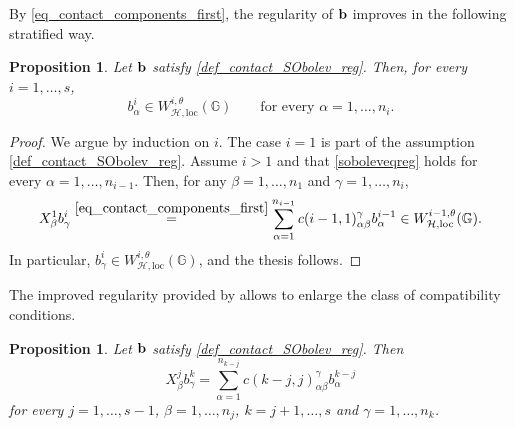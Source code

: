 \documentclass[11pt]{amsart}
\newcommand{\hhh}{{\mathcal{H}}}
\newcommand{\bb}{{\bf {b}}} %
\theoremstyle{plain}
\newtheorem{proposition}[theorem]{Proposition}
\theoremstyle{definition}
\theoremstyle{remark}
\numberwithin{equation}{section}
\begin{document}
By \eqref{eq_contact_components_first}, the regularity of $\bb$ improves in the following stratified way.
\begin{proposition}\label{rem_iterated_contact_components}
    Let $\bb$ satisfy \eqref{def_contact_SObolev_reg}. Then, for every $i=1,\ldots,s$,
    \begin{equation}\label{soboleveqreg}
        b^i_\alpha\in W^{i,\theta}_{\hhh,\mathrm{loc}}(\mathbb G)\qquad\text{for every $\alpha=1,\ldots,n_i$.}
    \end{equation}
\end{proposition}
\begin{proof} 
We argue by induction on $i$. The case $i=1$ is part of the assumption \eqref{def_contact_SObolev_reg}. Assume $i>1$ and that \eqref{soboleveqreg} holds for every $\alpha=1,\dots,n_{i-1}$. Then, for any $\beta=1,\ldots,n_1$ and $\gamma=1,\dots,n_i$,
\begin{equation*}
X^1_\beta b^i_\gamma \overset{\eqref{eq_contact_components_first}}{=} \sum_{\alpha=1}^{n_{i-1}} c(i-1,1)^\gamma_{\alpha \beta} b^{i-1}_\alpha \in W^{i-1,\theta}_{\hhh,\mathrm{loc}}(\mathbb{G}).
\end{equation*}
In particular, $b^i_\gamma \in W^{i,\theta}_{\hhh,\mathrm{loc}}(\mathbb{G})$, and the thesis follows.
\end{proof}
The improved regularity provided by  allows to enlarge the class of compatibility conditions.
\begin{proposition} \label{prop_contact_components}
  Let $\bb$ satisfy \eqref{def_contact_SObolev_reg}. Then
\begin{equation} \label{eq_contact_components}
X^j_\beta b^k_\gamma = \sum_{\alpha=1}^{n_{k-j}} c(k-j,j)^\gamma_{\alpha \beta} b^{k-j}_\alpha
\end{equation}
for every $j=1,\dots,s-1$, $\beta=1,\dots,n_j$, $k=j+1,\dots,s$ and $\gamma=1,\dots,n_k$.
\end{proposition}
\end{document}

